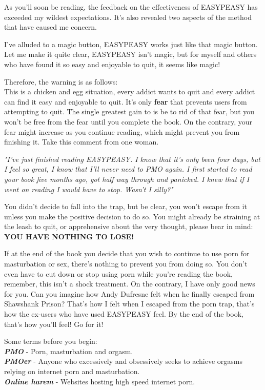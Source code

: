 \documentclass[easypeasy.tex]{subfiles}
\begin{document}
As you'll soon be reading, the feedback on the effectiveness of EASYPEASY has exceeded my wildest expectations. It's also revealed two aspects of the method that have caused me concern. 

I've alluded to a magic button, EASYPEASY works just like that magic button. Let me make it quite clear, EASYPEASY isn't magic, but for myself and others who have found it so easy and enjoyable to quit, it seems like magic!

Therefore, the warning is as follows:\\
This is a chicken and egg situation, every addict wants to quit and every addict can find it easy and enjoyable to quit. It's only \textbf{fear} that prevents users from attempting to quit. The single greatest gain to is be to rid of that fear, but you won't be free from the fear until you complete the book. On the contrary, your fear might increase as you continue reading, which might prevent you from finishing it. Take this comment from one woman.

\textit{\textit{"I've just finished reading EASYPEASY. I know that it's only been four days, but I feel so great, I know that I'll never need to PMO again. I first started to read your book five months ago, got half way through and panicked. I knew that if I went on reading I would have to stop. Wasn't I silly?"}}

You didn't decide to fall into the trap, but be clear, you won't escape from it unless you make the positive decision to do so. You might already be straining at the leash to quit, or apprehensive about the very thought, please bear in mind: 
\textbf{YOU HAVE NOTHING TO LOSE!}

If at the end of the book you decide that you wish to continue to use porn for masturbation or sex, there's nothing to prevent you from doing so. You don't even have to cut down or stop using porn while you're reading the book, remember, this isn't a shock treatment. On the contrary, I have only good news for you. Can you imagine how Andy Dufresne felt when he finally escaped from Shawshank Prison? That's how I felt when I escaped from the porn trap, that's how the ex-users who have used EASYPEASY feel. By the end of the book, that's how you'll feel! Go for it!

Some terms before you begin:\\
{\small \textbf{\textit{PMO}} - Porn, masturbation and orgasm.\\
  \textbf{\textit{PMOer}} - Anyone who excessively and obsessively seeks to achieve orgasms relying on internet porn and masturbation.\\
  \textbf{\textit{Online harem}} - Websites hosting high speed internet porn.
  }
\end{document}
